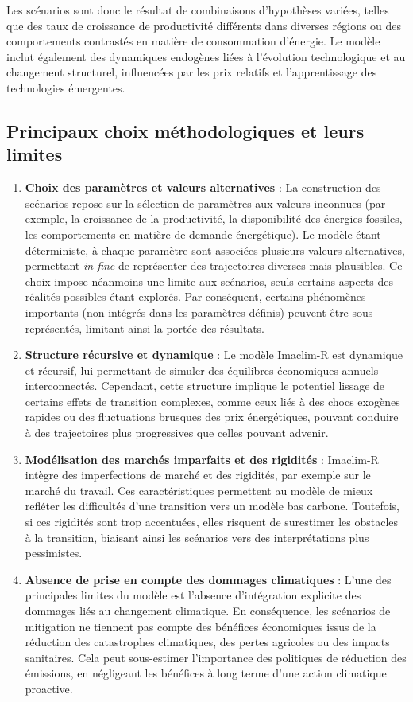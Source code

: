\documentclass[a4,11pt]{aleph-notas}
\begin{document}
Les scénarios sont donc le résultat de combinaisons d'hypothèses variées, telles que des taux de croissance de productivité différents dans diverses régions ou des comportements contrastés en matière de consommation d’énergie. Le modèle inclut également des dynamiques endogènes liées à l'évolution technologique et au changement structurel, influencées par les prix relatifs et l'apprentissage des technologies émergentes.

\subsection{Principaux choix méthodologiques et leurs limites}

\begin{enumerate}
    \item \textbf{Choix des paramètres et valeurs alternatives} : La construction des scénarios repose sur la sélection de paramètres aux valeurs inconnues (par exemple, la croissance de la productivité, la disponibilité des énergies fossiles, les comportements en matière de demande énergétique). Le modèle étant déterministe, à chaque paramètre sont associées plusieurs valeurs alternatives, permettant \textit{in fine} de représenter des trajectoires diverses mais plausibles. Ce choix impose néanmoins une limite aux scénarios, seuls certains aspects des réalités possibles étant explorés. Par conséquent, certains phénomènes importants (non-intégrés dans les paramètres définis) peuvent être sous-représentés, limitant ainsi la portée des résultats.
    \item \textbf{Structure récursive et dynamique} : Le modèle Imaclim-R est dynamique et récursif, lui permettant de simuler des équilibres économiques annuels interconnectés. Cependant, cette structure implique le potentiel lissage de certains effets de transition complexes, comme ceux liés à des chocs exogènes rapides ou des fluctuations brusques des prix énergétiques, pouvant conduire à des trajectoires plus progressives que celles pouvant advenir.
    \item \textbf{Modélisation des marchés imparfaits et des rigidités} : Imaclim-R intègre des imperfections de marché et des rigidités, par exemple sur le marché du travail. Ces caractéristiques permettent au modèle de mieux refléter les difficultés d'une transition vers un modèle bas carbone. Toutefois, si ces rigidités sont trop accentuées, elles risquent de surestimer les obstacles à la transition, biaisant ainsi les scénarios vers des interprétations plus pessimistes.
    \item \textbf{Absence de prise en compte des dommages climatiques} : L'une des principales limites du modèle est l'absence d'intégration explicite des dommages liés au changement climatique. En conséquence, les scénarios de mitigation ne tiennent pas compte des bénéfices économiques issus de la réduction des catastrophes climatiques, des pertes agricoles ou des impacts sanitaires. Cela peut sous-estimer l'importance des politiques de réduction des émissions, en négligeant les bénéfices à long terme d’une action climatique proactive.

\end{enumerate}
\end{document}
